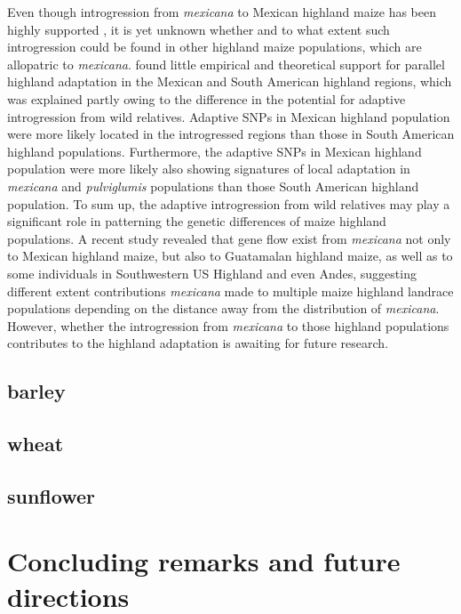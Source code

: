 \documentclass[11pt]{article}
\begin{document}
Even though introgression from \emph{mexicana} to Mexican highland maize has been highly supported \cite{hufford2013}, it is yet unknown whether and to what extent such introgression could be found in other highland maize populations, which are allopatric to \emph{mexicana}. 
\citep{Takuno2015} found little empirical and theoretical support for parallel highland adaptation in the Mexican and South American highland regions, which was explained partly owing to the difference in the potential for adaptive introgression from wild relatives.
Adaptive SNPs in Mexican highland population were more likely located in the introgressed regions than those in South American highland populations.
Furthermore, the adaptive SNPs in Mexican highland population were more likely also showing signatures of local adaptation in \emph{mexicana} and \emph {pulviglumis} populations than those South American highland population.
To sum up, the adaptive introgression from wild relatives may play a significant role in patterning the genetic differences of maize highland populations.
A recent study \cite{Wang2015manuscript} revealed that gene flow exist from \emph{mexicana} not only to Mexican highland maize, but also to Guatamalan highland maize, as well as to some individuals in Southwestern US Highland and even Andes, suggesting different extent contributions \emph{mexicana} made to multiple maize highland landrace populations depending on the distance away from the distribution of \emph{mexicana}. 
However, whether the introgression from \emph{mexicana} to those highland populations contributes to the highland adaptation is awaiting for future research. 
 
\subsection{barley}
\subsection{wheat}
\subsection{sunflower}

\section{Concluding remarks and future directions}



%
% 

\end{document}
